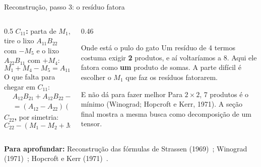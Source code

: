 \documentclass[aspectratio=169,xcolor=table]{beamer}
\newcommand{\fonte}[1]{%
  \vfill
  {\tiny\color{gray!55!black}\textbf{Para aprofundar:} #1\par}%
}
\begin{document}
\begin{frame}{Reconstrução, passo 3: o resíduo fatora}
  \begin{columns}[T]
    \begin{column}{0.5\textwidth}
      \scriptsize
      \textbf{$C_{11}$:} parta de $M_1$, tire o lixo $A_{11}B_{22}$ com $-M_5$ e o lixo
      $A_{22}B_{11}$ com $+M_4$:
      \[
        M_1 + M_4 - M_5 = A_{11}B_{11} + A_{22}B_{22} + A_{22}B_{21} - A_{12}B_{22}
      \]
      O que falta para chegar em $C_{11}$:
      \[
        \begin{aligned}
          &A_{12}B_{21} + A_{12}B_{22} - A_{22}B_{21} - A_{22}B_{22}\\
          &= (A_{12}-A_{22})(B_{21}+B_{22}) = M_7
        \end{aligned}
      \]
      \textbf{$C_{22}$,} por simetria:
      \[
        C_{22} - (M_1 - M_2 + M_3) = (A_{21}-A_{11})(B_{11}+B_{12}) = M_6
      \]
    \end{column}
    \begin{column}{0.46\textwidth}
      \begin{alertblock}{Onde está o pulo do gato}
        \scriptsize Um resíduo de 4 termos costuma exigir \textbf{2} produtos, e aí
        voltaríamos a 8. Aqui ele fatora como \textbf{um} produto de somas.
        A parte difícil é escolher o $M_1$ que faz os resíduos fatorarem.
      \end{alertblock}
      \begin{block}{E não dá para fazer melhor}
        \scriptsize Para $2\times2$, 7 produtos é o mínimo (Winograd; Hopcroft e Kerr, 1971).
        A seção final mostra a mesma busca como decomposição de um tensor.
      \end{block}
    \end{column}
  \end{columns}
  \fonte{Reconstrução das fórmulas de Strassen (1969)~\cite{strassen1969gaussian};
    Winograd (1971)~\cite{winograd1971multiplication};
    Hopcroft e Kerr (1971)~\cite{hopcroft1971minimizing}.}
\end{frame}
\end{document}

